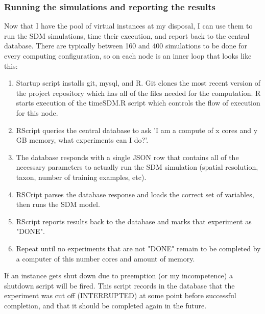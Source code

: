 \documentclass[a4paper]{article}
\begin{document}
\subsubsection{Running the simulations and reporting the results}
Now that I have the pool of virtual instances at my disposal, I can use them to run the SDM simulations, time their execution, and report back to the central database. There are typically between 160 and 400 simulations to be done for every computing configuration, so on each node is an inner loop that looks like this:
\begin{enumerate}
\item Startup script installs git, mysql, and R. Git clones the most recent version of the project repository which has all of the files needed for the computation. R starts execution of the timeSDM.R script which controls the flow of execution for this node.
\item RScript queries the central database to ask 'I am a compute of x cores and y GB memory, what experiments can I do?'.
\item The database responds with a single JSON row that contains all of the necessary parameters to actually run the SDM simulation (spatial resolution, taxon, number of training examples, etc).
\item RSCript parses the database response and loads the correct set of variables, then runs the SDM model.
\item RScript reports results back to the database and marks that experiment as "DONE".
\item Repeat until no experiments that are not "DONE" remain to be completed by a computer of this number cores and amount of memory.
\end{enumerate}

If an instance gets shut down due to preemption (or my incompetence) a shutdown script will be fired. This script records in the database that the experiment was cut off (INTERRUPTED) at some point before successful completion, and that it should be completed again in the future.
\end{document}
